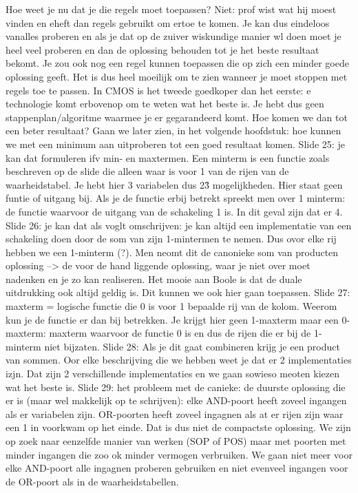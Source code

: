 \documentclass[10pt,a4paper]{book}
\begin{document}
Hoe weet je nu dat je die regels moet toepassen? Niet: prof wist wat hij moest vinden en eheft dan regels gebruikt om ertoe te komen. Je kan dus eindeloos vanalles proberen en als je dat op de zuiver wiskundige manier wl doen moet je heel veel proberen en dan de oplossing behouden tot je het beste resultaat bekomt. Je zou ook nog een regel kunnen toepassen die op zich een minder goede oplossing geeft. Het is dus heel moeilijk om te zien wanneer je moet stoppen met regels toe te passen. In CMOS is het tweede goedkoper dan het eerste: e technologie komt erbovenop om te weten wat het beste is.
Je hebt dus geen stappenplan/algoritme waarmee je er gegarandeerd komt. Hoe komen we dan tot een beter resultaat? Gaan we later zien, in het volgende hoofdstuk: hoe kunnen we met een minimum aan uitproberen tot een goed resultaat komen.
Slide 25: je kan dat formuleren ifv min- en maxtermen. Een minterm is een functie zoals beschreven op de slide die alleen waar is voor 1 van de rijen van de waarheidstabel. Je hebt hier 3 variabelen dus 2\^3 mogelijkheden. Hier staat geen funtie of uitgang bij. Als je de functie erbij betrekt spreekt men over 1 minterm: de functie waarvoor de uitgang van de schakeling 1 is. In dit geval zijn dat er 4. 
Slide 26: je kan dat als voglt omschrijven: je kan altijd een implementatie van een schakeling doen door de som van zijn 1-mintermen te nemen. Dus ovor elke rij hebben we een 1-minterm (?). Men neomt dit de canonieke som van producten oplossing --> de voor de hand liggende oplossing, waar je niet over moet nadenken en je zo kan realiseren.
Het mooie aan Boole is dat de duale uitdrukking ook altijd geldig is. Dit kunnen we ook hier gaan toepassen.
Slide 27: maxterm = logische functie die 0 is voor 1 bepaalde rij van de kolom. Weerom kun je de functie er dan bij betrekken. Je krijgt hier geen 1-maxterm maar een 0-maxterm: maxterm waarvoor de functie 0 is en dus de rijen die er bij de 1-minterm niet bijzaten.
Slide 28: Als je dit gaat combineren krijg je een product van sommen. Oor elke beschrijving die we hebben weet je dat er 2 implementaties izjn. Dat zijn 2 verschillende implementaties en we gaan sowieso meoten kiezen wat het beste is.
Slide 29: het probleem met de canieke: de duurste oplossing die er is (maar wel makkelijk op te schrijven): elke AND-poort heeft zoveel ingangen als er variabelen zijn. OR-poorten heeft zoveel ingagnen als at er rijen zijn waar een 1 in voorkwam op het einde. Dat is dus niet de compactste oplossing. We zijn op zoek naar eenzelfde manier van werken (SOP of POS) maar met poorten met minder ingangen die zoo ok minder vermogen verbruiken. We gaan niet meer voor elke AND-poort alle ingagnen proberen gebruiken en niet evenveel ingangen voor de OR-poort als in de waarheidstabellen.
\end{document}
